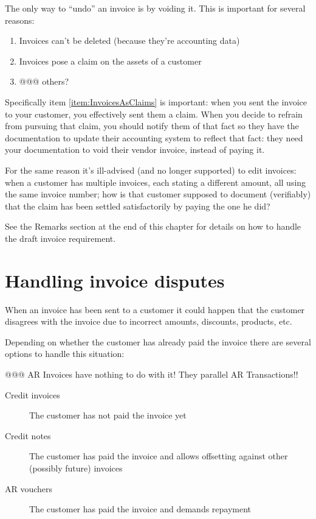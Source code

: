 The only way to ``undo'' an invoice is by voiding it. This is important for several
reasons:

\begin{enumerate}
\item Invoices can't be deleted (because they're accounting data)
\item Invoices pose a claim on the assets of a \gls{customer}
\label{item:InvoicesAsClaims}
\item @@@ others?
\end{enumerate}

Specifically item \ref{item:InvoicesAsClaims} is important: when you sent the invoice
to your \gls{customer}, you effectively sent them a claim. When you decide to refrain from
pursuing that claim, you should notify them of that fact so they have the documentation
to update their accounting system to reflect that fact: they need your documentation
to void their vendor invoice, instead of paying it.

For the same reason it's ill-advised (and no longer supported) to edit invoices:
when a \gls{customer} has multiple invoices, each stating a different amount, all
using the same invoice number; how is that \gls{customer} supposed to document (verifiably)
that the claim has been settled satisfactorily by paying the one he did?

See the Remarks section at the end of this chapter for details on how to handle
the draft invoice requirement.

\section{Handling invoice disputes}
\label{sec-workflows-invoicing-handling-disputes}

When an invoice has been sent to a \gls{customer} it could happen that the customer disagrees
with the invoice due to incorrect amounts, discounts, products, etc.

Depending on whether the customer has already paid the invoice there are several
options to handle this situation:

@@@ AR Invoices have nothing to do with it! They parallel AR Transactions!!

\begin{description}
\item [Credit invoices] The \gls{customer} has not paid the invoice yet
\item [Credit notes] The customer has paid the invoice and allows offsetting against
   other (possibly future) invoices
\item[AR vouchers] The customer has paid the invoice and demands repayment
\end{description}

